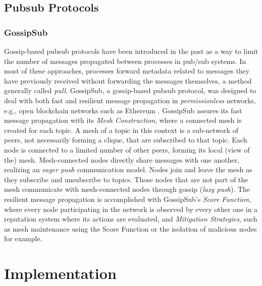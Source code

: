 \documentclass[sigconf]{acmart}
\begin{document}

\subsection{Pubsub Protocols}

\subsubsection{GossipSub} %

Gossip-based pubsub protocols have been introduced in the past as a way to limit the number of messages propagated between processes in pub/sub systems. In most of these approaches, processes forward metadata related to messages they have previously received without forwarding the messages themselves, a method generally called \textit{pull}.
GossipSub, a gossip-based pubsub protocol, was designed to deal with both fast and resilient message propagation in \textit{permissionless} networks, e.g., open blockchain networks such as Ethereum \cite{dannen2017introducing}.
GossipSub assures its fast message propagation with its \textit{Mesh Construction}, where a connected mesh is created for each topic. A mesh of a topic in this context is a sub-network of peers, not necessarily forming a clique, that are subscribed to that topic. Each node is connected to a limited number of other peers, forming its local (view of the) mesh. Mesh-connected nodes directly share messages with one another, realizing an \textit{eager push} communication model. Nodes join and leave the mesh as they subscribe and unsubscribe to topics. Those nodes that are not part of the mesh communicate with mesh-connected nodes through gossip (\textit{lazy push}).
The resilient message propagation is accomplished with GossipSub's \textit{Score Function}, where every node participating in the network is observed by every other one in a reputation system where its actions are evaluated, and \textit{Mitigation Strategies}, such as mesh maintenance using the Score Function or the isolation of malicious nodes for example.

\section{Implementation}
\end{document}
